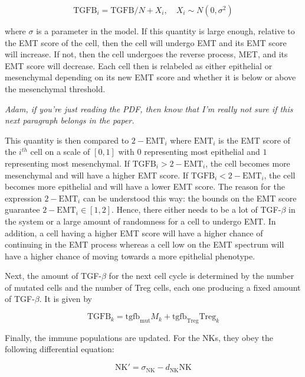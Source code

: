 \documentclass{article}
\begin{document}
$$ \text{TGFB}_i = \text{TGFB}/N + X_i, \quad X_i \sim N(0,\sigma^2)$$

where $\sigma$ is a parameter in the model.
If this quantity is large enough, relative to the EMT score of the cell, then the cell will undergo EMT and its EMT score will increase.
If not, then the cell undergoes the reverse process, MET, and its EMT score will decrease.
Each cell then is relabeled as either epithelial or mesenchymal depending on its new EMT score and whether it is below or above the mesenchymal threshold.




\emph{Adam, if you're just reading the PDF, then know that I'm really not sure if this next paragraph belongs in the paper.}

This quantity is then compared to $2-\text{EMT}_i$ where $\text{EMT}_i$ is the EMT score of the $i^{th}$ cell on a scale of $[0,1]$ with $0$ representing most epithelial and $1$ representing most mesenchymal.
If $\text{TGFB}_i>2-\text{EMT}_i$, the cell becomes more mesenchymal and will have a higher EMT score.
If $\text{TGFB}_i<2-\text{EMT}_i$, the cell becomes more epithelial and will have a lower EMT score.
The reason for the expression $2-\text{EMT}_i$ can be understood this way: 
the bounds on the EMT score guarantee $2-\text{EMT}_i\in[1,2]$.
Hence, there either needs to be a lot of TGF-$\beta$ in the system or a large amount of randomness for a cell to undergo EMT.
In addition, a cell having a higher EMT score will have a higher chance of continuing in the EMT process whereas a cell low on the EMT spectrum will have a higher chance of moving towards a more epithelial phenotype.




Next, the amount of TGF-$\beta$ for the next cell cycle is determined by the number of mutated cells and the number of Treg cells, each one producing a fixed amount of TGF-$\beta$. It is given by

$$ \text{TGFB}_k = \text{tgfb}_{\text{mut}}M_k + \text{tgfb}_{\text{Treg}}\text{Treg}_k$$ %

Finally, the immune populations are updated.
For the NKs, they obey the following differential equation:
 
$$ \text{NK}' = \sigma_{\text{NK}} - d_{\text{NK}}\text{NK} $$
\end{document}
